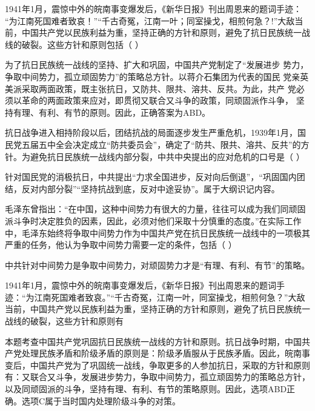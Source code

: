 \question 1941年1月，震惊中外的皖南事变爆发后，《新华日报》刊出周恩来的题词手迹：
``为江南死国难者致哀！''``千古奇冤，江南一叶；同室操戈，相煎何急？!''大敌当
前，中国共产党以民族利益为重，坚持正确的方针和原则，避免了抗日民族统一战
线的破裂。这些方针和原则包括（ ）
\par{}
\begin{solution}为了抗日民族统一战线的坚持、扩大和巩固，中国共产党制定了``发展进步
势力，争取中间势力，孤立顽固势力''的策略总方针。以蒋介石集团为代表的国民
党亲英美派采取两面政策，既主张抗日，又防共、限共、溶共、反共。为此，共产
党必须以革命的两面政策来应对，即贯彻又联合又斗争的政策，同顽固派作斗争，
坚持有理、有利、有节的原则。因此，正确答案为ABD。
\end{solution}
\question 抗日战争进入相持阶段以后，团结抗战的局面逐步发生严重危机，1939年1月，国民党五届五中全会决定成立``防共委员会''，确定了``防共、限共、溶共、反共''的方针。为避免抗日民族统一战线内部分裂，中共中央提出的应对危机的口号是（
）
\par{}
\begin{solution}针对国民党的消极抗日，中共提出``力求全国进步，反对向后倒退''，``巩固国内团结，反对内部分裂''``坚持抗战到底，反对中途妥协''。属于大纲识记内容。
\end{solution}
\question 毛泽东曾指出：``在中国，这种中间势力有很大的力量，往往可以成为我们同顽固派斗争时决定胜负的因素，因此，必须对他们采取十分慎重的态度。''在实际工作中，毛泽东始终将争取中间势力作为中国共产党在抗日民族统一战线中的一项极其严重的任务，他认为争取中间势力需要一定的条件，包括（
）
\par{}
\begin{solution}中共针对中间势力是争取中间势力，对顽固势力才是``有理、有利、有节''的策略。
\end{solution}
\question 1941年1月，震惊中外的皖南事变爆发后，《新华日报》刊出周恩来的题词手迹：``为江南死国难者致哀。''``千古奇冤，江南一叶，同室操戈，相煎何急？''大敌当前，中国共产党以民族利益为重，坚持正确的方针和原则，避免了抗日民族统一战线的破裂，这些方针和原则有
\par{}
\begin{solution}本题考查中国共产党巩固抗日民族统一战线的方针和原则。抗日战争时期，中国共产党处理民族矛盾和阶级矛盾的原则是：阶级矛盾服从于民族矛盾。因此，皖南事变后，中国共产党为了巩固统一战线，争取更多的人参加抗日，采取的方针和原则有：又联合又斗争，发展进步势力，争取中间势力，孤立顽固势力的策略总方针，以及同顽固派的斗争，坚持有理、有利、有节的策略原则。因此，选项ABD正确。选项C属于当时国内处理阶级斗争的对策。
\end{solution}
